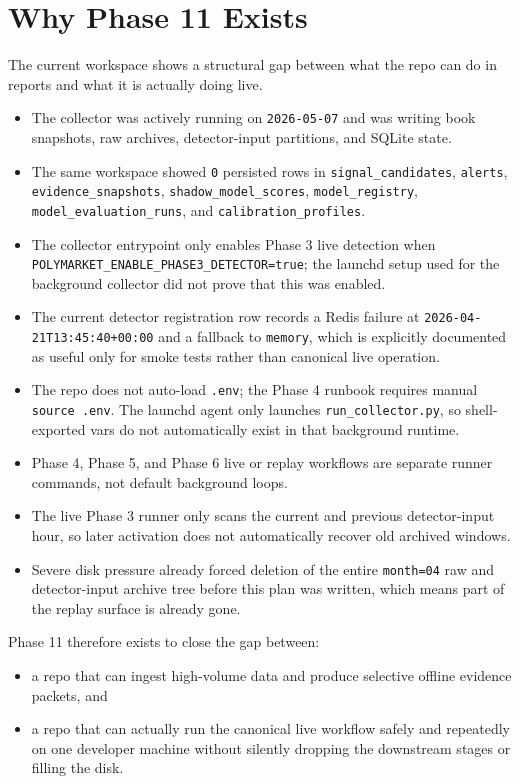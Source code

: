 \documentclass{article}
\begin{document}
\section*{Why Phase 11 Exists}
The current workspace shows a structural gap between what the repo can do in reports and what it is actually doing live.
\begin{itemize}
\item The collector was actively running on \texttt{2026-05-07} and was writing book snapshots, raw archives, detector-input partitions, and SQLite state.
\item The same workspace showed \texttt{0} persisted rows in \texttt{signal\_candidates}, \texttt{alerts}, \texttt{evidence\_snapshots}, \texttt{shadow\_model\_scores}, \texttt{model\_registry}, \texttt{model\_evaluation\_runs}, and \texttt{calibration\_profiles}.
\item The collector entrypoint only enables Phase 3 live detection when \texttt{POLYMARKET\_ENABLE\_PHASE3\_DETECTOR=true}; the launchd setup used for the background collector did not prove that this was enabled.
\item The current detector registration row records a Redis failure at \texttt{2026-04-21T13:45:40+00:00} and a fallback to \texttt{memory}, which is explicitly documented as useful only for smoke tests rather than canonical live operation.
\item The repo does not auto-load \texttt{.env}; the Phase 4 runbook requires manual \texttt{source .env}. The launchd agent only launches \texttt{run\_collector.py}, so shell-exported vars do not automatically exist in that background runtime.
\item Phase 4, Phase 5, and Phase 6 live or replay workflows are separate runner commands, not default background loops.
\item The live Phase 3 runner only scans the current and previous detector-input hour, so later activation does not automatically recover old archived windows.
\item Severe disk pressure already forced deletion of the entire \texttt{month=04} raw and detector-input archive tree before this plan was written, which means part of the replay surface is already gone.
\end{itemize}

Phase 11 therefore exists to close the gap between:
\begin{itemize}
\item a repo that can ingest high-volume data and produce selective offline evidence packets, and
\item a repo that can actually run the canonical live workflow safely and repeatedly on one developer machine without silently dropping the downstream stages or filling the disk.
\end{itemize}
\end{document}
